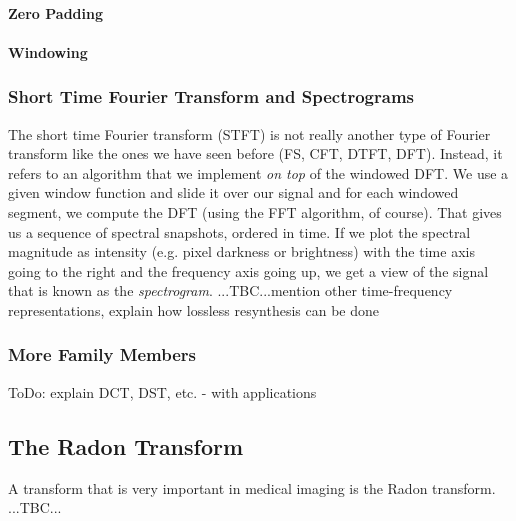 \paragraph{Zero Padding}

\paragraph{Windowing}


\subsubsection{Short Time Fourier Transform and Spectrograms}
The short time Fourier transform (STFT) is not really another type of Fourier transform like the ones we have seen before (FS, CFT, DTFT, DFT). Instead, it refers to an algorithm that we implement \emph{on top} of the windowed DFT. We use a given window function and slide it over our signal and for each windowed segment, we compute the DFT (using the FFT algorithm, of course). That gives us a sequence of spectral snapshots, ordered in time. If we plot the spectral magnitude as intensity (e.g. pixel darkness or brightness) with the time axis going to the right and the frequency axis going up, we get a view of the signal that is known as the \emph{spectrogram}. ...TBC...mention other time-frequency representations, explain how lossless resynthesis can be done



\subsubsection{More Family Members}
ToDo: explain DCT, DST, etc. - with applications


\subsection{The Radon Transform}
A transform that is very important in medical imaging is the Radon transform. ...TBC...




